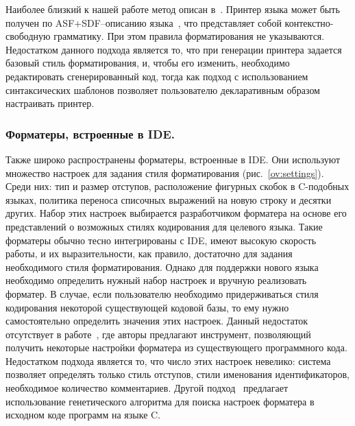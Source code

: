 Наиболее близкий к нашей работе метод описан в~\cite{paper:asf-sdf}.
Принтер языка может быть получен по ASF+SDF--описанию языка~\cite{paper:klint}, что представляет собой контекстно-свободную грамматику.
При этом правила форматирования не указываются.
Недостатком данного подхода является то, что при генерации принтера задается базовый стиль форматирования, и, чтобы его изменить, необходимо редактировать сгенерированный код, тогда как подход с использованием синтаксических шаблонов позволяет пользователю декларативным образом настраивать принтер.

\subsubsection{Форматеры, встроенные в IDE.}
Также широко распространены форматеры, встроенные в IDE.
Они используют множество настроек для задания стиля форматирования (рис.~\ref{ov:settings}).
Среди них: тип и размер отступов, расположение фигурных скобок в C-подобных языках, политика переноса списочных выражений на новую строку и десятки других.
Набор этих настроек выбирается разработчиком форматера на основе его представлений о возможных стилях кодирования для целевого языка.
Такие форматеры обычно тесно интегрированы с IDE, имеют высокую скорость работы, и их выразительности, как правило, достаточно для задания необходимого стиля форматирования.
Однако для поддержки нового языка необходимо определить нужный набор настроек и вручную реализовать форматер.
В случае, если пользователю необходимо придерживаться стиля кодирования некоторой существующей кодовой базы, то ему нужно самостоятельно определить значения этих настроек.
Данный недостаток отсутствует в работе~\cite{paper:sformatters}, где авторы предлагают инструмент, позволяющий получить некоторые настройки форматера из существующего программного кода.
Недостатком подхода является то, что число этих настроек невелико: система позволяет определять только стиль отступов, стили именования идентификаторов, необходимое количество комментариев.
Другой подход~\cite{blog:genformat} предлагает использование генетического алгоритма 
для поиска настроек форматера в исходном коде программ на языке C.

